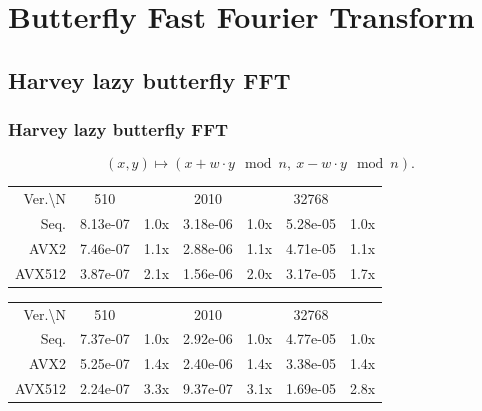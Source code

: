 \documentclass[10pt]{beamer}
\begin{document}
\section{Butterfly Fast Fourier Transform}
\subsection{Harvey lazy butterfly FFT}
\begin{frame}
    \frametitle{Harvey lazy butterfly FFT}
    \[
    (x,y) \mapsto (x + w\cdot y \mod n,\ x - w\cdot y \mod n).
    \]
\end{frame}

\begin{frame}
    \begin{table}[h!]
        \centering
        
        \begin{tabular}{|r|*{3}{c c|}}
            \hline
            \rowcolor{myGray} 
            \multicolumn{7}{|c|}{\textsc{Cascade Lake}} \\
    
            \hline
            \rowcolor{myGray}
            Ver.\textbackslash N & 510 & & 2010 & & 32768 & \\
            \hline
            \cellcolor{myGray} Seq. & 8.13e-07 & 1.0x & 3.18e-06 & 1.0x & 5.28e-05 & 1.0x \\
            \hline
            \cellcolor{myGray} AVX2 & 7.46e-07 & 1.1x & 2.88e-06 & 1.1x & 4.71e-05 & 1.1x \\
            \hline
            \cellcolor{myGray} AVX512 & 3.87e-07 & 2.1x & 1.56e-06 & 2.0x & 3.17e-05 & 1.7x \\
            \hline
        \end{tabular}
    
        \begin{tabular}{|r|*{3}{c c|}}
            \hline
            \rowcolor{myGray} 
            \multicolumn{7}{|c|}{\textsc{Ice Lake}} \\
    
            \hline
            \rowcolor{myGray}
            Ver.\textbackslash N & 510 & & 2010 & & 32768 & \\
            \hline
            \cellcolor{myGray} Seq. & 7.37e-07 & 1.0x & 2.92e-06 & 1.0x & 4.77e-05 & 1.0x \\
            \hline
            \cellcolor{myGray} AVX2 & 5.25e-07 & 1.4x & 2.40e-06 & 1.4x & 3.38e-05 & 1.4x \\
            \hline
            \cellcolor{myGray} AVX512 & 2.24e-07 & 3.3x & 9.37e-07 & 3.1x & 1.69e-05 & 2.8x \\
            \hline
        \end{tabular}
    

\end{table}
\end{frame}
\end{document}
